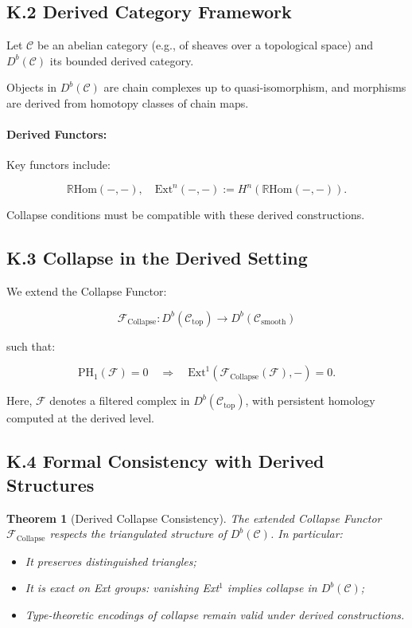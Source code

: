\documentclass[11pt]{article}
\newtheorem{theorem}{Theorem}[section]
\begin{document}
\subsection*{K.2 Derived Category Framework}

Let \( \mathcal{C} \) be an abelian category (e.g., of sheaves over a topological space) and \( D^b(\mathcal{C}) \) its bounded derived category.

Objects in \( D^b(\mathcal{C}) \) are chain complexes up to quasi-isomorphism, and morphisms are derived from homotopy classes of chain maps.

\paragraph{Derived Functors:}
Key functors include:

\[
\mathbb{R}\mathrm{Hom}(-, -), \quad \mathrm{Ext}^n(-, -) := H^n(\mathbb{R}\mathrm{Hom}(-, -)).
\]

Collapse conditions must be compatible with these derived constructions.

\subsection*{K.3 Collapse in the Derived Setting}

We extend the Collapse Functor:

\[
\mathcal{F}_{\mathrm{Collapse}} : D^b(\mathcal{C}_{\mathrm{top}}) \to D^b(\mathcal{C}_{\mathrm{smooth}})
\]

such that:

\[
\mathrm{PH}_1(\mathcal{F}) = 0 \quad \Rightarrow \quad \mathrm{Ext}^1(\mathcal{F}_{\mathrm{Collapse}}(\mathcal{F}), -) = 0.
\]

Here, \( \mathcal{F} \) denotes a filtered complex in \( D^b(\mathcal{C}_{\mathrm{top}}) \), with persistent homology computed at the derived level.

\subsection*{K.4 Formal Consistency with Derived Structures}

\begin{theorem}[Derived Collapse Consistency]
The extended Collapse Functor \( \mathcal{F}_{\mathrm{Collapse}} \) respects the triangulated structure of \( D^b(\mathcal{C}) \). In particular:

\begin{itemize}
    \item It preserves distinguished triangles;
    \item It is exact on Ext groups: vanishing Ext$^1$ implies collapse in \( D^b(\mathcal{C}) \);
    \item Type-theoretic encodings of collapse remain valid under derived constructions.
\end{itemize}
\end{theorem}
\end{document}
